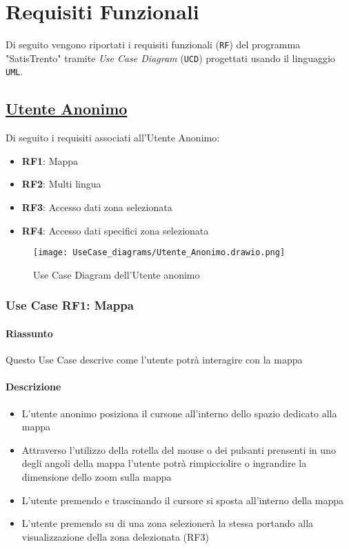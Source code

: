 \chapter{Requisiti Funzionali}
\label{ch:requisitiFunzionali}

Di seguito vengono riportati i requisiti funzionali (\texttt{RF}) del programma "SatisTrento" tramite \textit{Use Case Diagram} (\texttt{UCD}) progettati usando il linguaggio \texttt{UML}.

\section{\underline{Utente Anonimo}}
    Di seguito i requisiti associati all'Utente Anonimo:
    \begin{itemize}
        \item \textbf{RF1}: Mappa
        \item \textbf{RF2}: Multi lingua
        \item \textbf{RF3}: Accesso dati zona selezionata
        \item \textbf{RF4}: Accesso dati specifici zona selezionata
    \end{itemize}
    \begin{figure}[H]
        \centering
        \texttt{[image: UseCase\_diagrams/Utente\_Anonimo.drawio.png]}
        \caption{Use Case Diagram dell'Utente anonimo}
    \end{figure}
    \subsection{Use Case {RF1}: Mappa}
        \subsubsection{Riassunto}
            Questo Use Case descrive come l'utente potrà interagire con la mappa
        \subsubsection{Descrizione}
            \begin{itemize}
            \item L'utente anonimo posiziona il cursone all'interno dello spazio dedicato alla mappa
            \item Attraverso l'utilizzo della rotella del mouse o dei pulsanti prensenti in uno degli angoli della mappa l'utente potrà rimpicciolire o ingrandire la dimensione dello zoom sulla mappa
            \item L'utente premendo e trascinando il cursore si sposta all'interno della mappa
            \item L'utente premendo su di una zona selezionerà la stessa portando alla visualizzazione della zona delezionata (RF3)
            \end{itemize}
